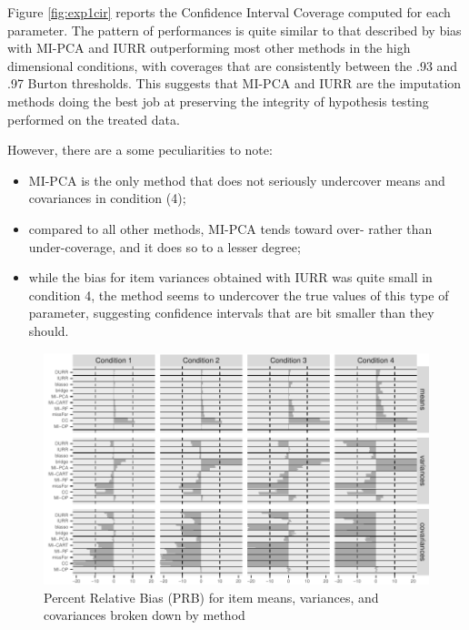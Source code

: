 	Figure \ref{fig:exp1cir} reports the Confidence Interval Coverage computed for each parameter.
	The pattern of performances is quite similar to that described by bias with MI-PCA and IURR 
	outperforming most other methods in the high dimensional conditions, with coverages that are consistently
	between the .93 and .97 Burton thresholds.
	This suggests that MI-PCA and IURR are the imputation methods doing the best job at preserving
	the integrity of hypothesis testing performed on the treated data.

	However, there are a some peculiarities to note: 
	\begin{itemize}
	\item MI-PCA is the only method that does not seriously undercover means and covariances in condition (4);
	\item compared to all other methods, MI-PCA tends toward over- rather than under-coverage, and it 
	does so to a lesser degree;
	\item while the bias for item variances obtained with IURR was quite small in condition 4, the method seems 
	to undercover the true values of this type of parameter, suggesting confidence intervals that are bit smaller
	than they should.
	\end{itemize}

\begin{figure}
	\includegraphics{../../output/graphs/exp1_bias.pdf}
\caption{Percent Relative Bias (PRB) for item means, variances, and covariances broken 
	down by method}
\label{fig:exp1bias}
\end{figure}

